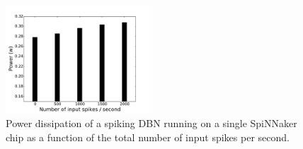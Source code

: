 \begin{figure}[hbt!]
	\centering
	\includegraphics[width=0.48\textwidth]{images/evan/powerspinnaker.pdf}
	\caption{Power dissipation of a spiking DBN running on a single SpiNNaker chip as a function of the total number of input spikes per second.}
	\label{Fig:spinnchipPower}
\end{figure} 


%
%
%
%
%
%

